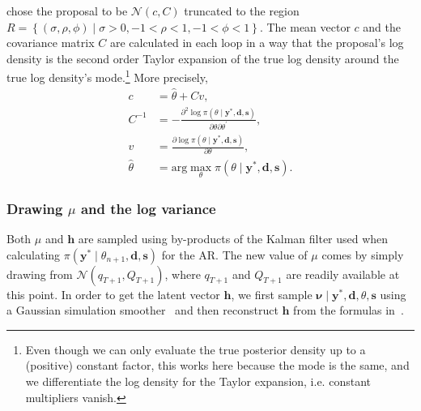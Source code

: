 \citeauthor{Nakajima2009} chose the proposal to be $\mathcal{N}(c, C)$ truncated to the region $R=\left\{(\sigma,\rho,\phi)\mid\sigma>0,-1<\rho<1,-1<\phi<1\right\}$.
The mean vector $c$ and the covariance matrix $C$ are calculated in each loop in a way that the proposal's log density is the second order Taylor expansion of the true log density around the true log density's mode.\footnote{
	Even though we can only evaluate the true posterior density up to a (positive) constant factor, this works here because the mode is the same, and we differentiate the log density for the Taylor expansion, i.e. constant multipliers vanish.}
More precisely,
\begin{align*}
c &= \hat{\theta}+Cv, \\
C^{-1} &= -\frac{\partial^2\log\pi(\theta\mid\bm{y}^\ast,\bm{d},\bm s)}{\partial\theta\partial\theta^\prime}, \\
v &= \frac{\partial\log\pi(\theta\mid\bm{y}^\ast,\bm{d},\bm s)}{\partial\theta}, \\
\hat{\theta} &= \text{arg}\max_\theta\pi(\theta\mid\bm{y}^\ast,\bm{d},\bm s).
\end{align*}

\subsubsection{Drawing $\mu$ and the log variance}

Both $\mu$ and $\bm h$ are sampled using by-products of the Kalman filter used when calculating $\pi(\bm{y}^\ast\mid\theta_{n+1},\bm{d},\bm s)$ for the AR.
The new value of $\mu$ comes by simply drawing from $\mathcal{N}(q_{T+1},Q_{T+1})$, where $q_{T+1}$ and $Q_{T+1}$ are readily available at this point.
In order to get the latent vector $\bm h$, we first sample $\bm{\nu}\mid\bm{y}^\ast,\bm{d},\theta,\bm s$ using a Gaussian simulation smoother~\citep{fruhwirth1994data,carter1994gibbs} and then reconstruct $\bm h$ from the formulas in~\citet{de1995simulation}.


